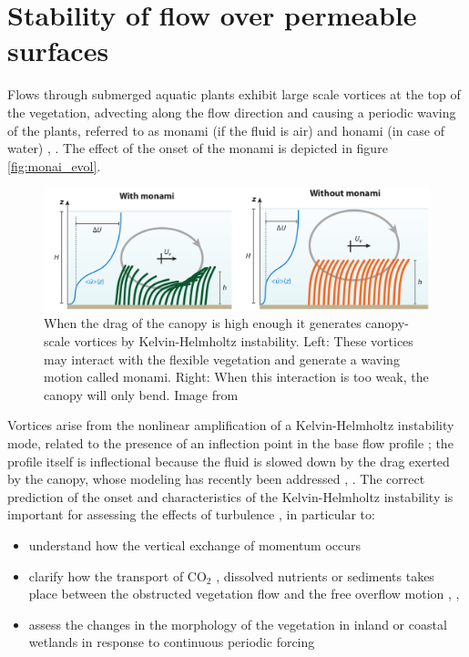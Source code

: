 \section{Stability of flow over permeable surfaces}
\label{sec:stability}

Flows through submerged aquatic plants exhibit large scale vortices at the top of the vegetation,
advecting along the flow direction and causing a periodic waving of the plants, referred to as
monami (if the fluid is air) and honami (in case of water) \citet{inoue1955studies}, \citet{ackerman1993reduced}.
The effect of the onset of the monami is depicted in figure \ref{fig:monai_evol}.


\begin{figure}[h]
	\centering
	\includegraphics[width=1\linewidth]{chapter_1/monami}
	\caption{When the drag of the canopy is high enough it generates canopy-scale vortices by Kelvin-Helmholtz instability. Left: These  vortices may interact with the flexible vegetation and generate a waving motion called monami. Right: When this interaction is too weak, the canopy will only bend. Image from \citet{nepf2012flow}}
	\label{fig:monami}
\end{figure}

Vortices arise from the nonlinear amplification of a Kelvin-Helmholtz instability mode, related to the presence of an inflection point in the base flow profile \citet{asaeda2005morphological}; the profile itself is inflectional because the fluid is slowed down by the drag exerted by the canopy, whose modeling has recently been addressed \citet{py2004mixing} \citet{singh2016linear}  \citet{zampogna2016instability}, \citet{tilton2008linear}.
The correct prediction of the onset and characteristics of the Kelvin-Helmholtz instability is important for assessing the effects of turbulence \citet{finnigan2000turbulence}, \citet{jimenez2001turbulent} in particular to:
\begin{itemize}
	\item understand how the vertical exchange of momentum occurs \citet{ikeda1996three}
	\item clarify how the transport of $\text{CO}_2$ , dissolved nutrients or sediments takes place between the
	obstructed vegetation flow and the free overflow motion \citet{gambi1990flume}, \citet{eckman1987role}, \citet{grizzle1996hydrodynamically}
	\item assess the changes in the morphology of the vegetation in inland or coastal wetlands in
	response to continuous periodic forcing \citet{asaeda2005morphological} \citet{patil2010characteristics}
\end{itemize}

